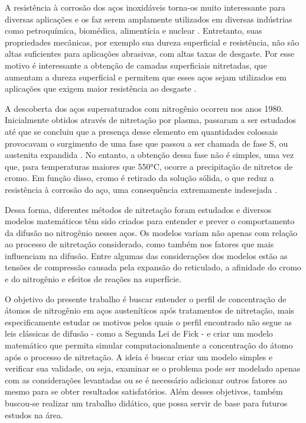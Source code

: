 A resistência à corrosão dos aços inoxidáveis torna-os muito interessante para diversas aplicações e os faz serem amplamente utilizados em diversas indústrias como petroquímica, biomédica, alimentícia e nuclear \cite{peng2018numerical}. Entretanto, suas propriedades mecânicas, por exemplo sua dureza superficial e resistência, não são altas suficientes para aplicações abrasivas, com altas taxas de desgaste. Por esse motivo é interessante a obtenção de camadas superficiais nitretadas, que aumentam a dureza superficial e permitem que esses aços sejam utilizados em aplicações que exigem maior resistência ao desgaste \cite{moller2001surface}.

A descoberta dos aços supersaturados com nitrogênio ocorreu nos anos 1980. Inicialmente obtidos através de nitretação por plasma, passaram a ser estudados até que se concluiu que a presença desse elemento em quantidades colossais provocavam o surgimento de uma fase que passou a ser chamada de fase S, ou austenita expandida \cite{christiansen2006controlled}. No entanto, a obtenção dessa fase não é simples, uma vez que, para temperaturas maiores que 550°C, ocorre a precipitação de nitretos de cromo. Em função disso, cromo é retirado da solução sólida, o que reduz a resistência à corrosão do aço, uma consequência extremamente indesejada \cite{tschiptschin2010estrutura}.

Dessa forma, diferentes métodos de nitretação foram estudados e diversos modelos matemáticos têm sido criados para entender e prever o comportamento da difusão no nitrogênio nesses aços. Os modelos variam não apenas com relação ao processo de nitretação considerado, como também nos fatores que mais influenciam na difusão. Entre algumas das considerações dos modelos estão as tensões de compressão causada pela expansão do reticulado, a afinidade do cromo e do nitrogênio e efeitos de reações na superfície.

O objetivo do presente trabalho é buscar entender o perfil de concentração de átomos de nitrogênio em aços austeníticos após tratamentos de nitretação, mais especificamente estudar os motivos pelos quais o perfil encontrado não segue as leis clássicas de difusão - como a Segunda Lei de Fick - e criar um modelo matemático que permita simular computacionalmente a concentração do átomo após o processo de nitretação. A ideia é buscar criar um modelo simples e verificar sua validade, ou seja, examinar se o problema pode ser modelado apenas com as considerações levantadas ou se é necessário adicionar outros fatores ao mesmo para se obter resultados satisfatórios.
Além desses objetivos, também buscou-se realizar um trabalho didático, que possa servir de base para futuros estudos na área.